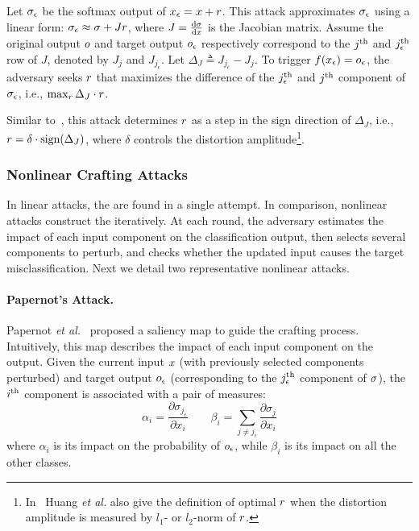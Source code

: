 Let $\sigma_\epsilon$ be the softmax output of $x_{\epsilon} = x + r$. This attack approximates $\sigma_\epsilon$ using a linear form:
$\sigma_\epsilon \approx \sigma + J r$,
 where $J = \frac{{\rm d} \sigma}{{\rm d} x}$ is the Jacobian matrix.
Assume the original output $o$ and target output $o_\epsilon$ respectively correspond to the $j^{\rm th}$ and $j_\epsilon^{\rm th}$ row of $J$, denoted by $J_j$ and $J_{j_\epsilon}$. Let $\Delta_J \triangleq J_{j_\epsilon}  - J_j$. To trigger $f(x_{\epsilon}) = o_\epsilon$, the adversary seeks $r$ that maximizes the difference of the $j_\epsilon^{\rm th}$ and $j^{\rm th}$ component of $\sigma_\epsilon$, i.e.,
$\max_{r}  \Delta_J  \cdot r$.

Similar to~\cite{Goodfellow:2014:arxiv}, this attack determines $r$ as a step in the sign direction of $\Delta_J$, i.e.,
$ r = \delta \cdot  \textrm{sign}(\Delta_J)$,
where $\delta$ controls the distortion amplitude\footnote{In~\cite{Huang:2015:arxiv} Huang {\em et al.} also give the definition of optimal $r$ when the distortion amplitude is measured by $l_1$- or $l_2$-norm of $r$.}.


\subsubsection{Nonlinear Crafting Attacks}

In linear attacks, the \pvs are found in a single attempt. In comparison, nonlinear attacks construct the \pvs iteratively. At each round, the adversary estimates the impact of each input component on the classification output, then selects several components to perturb, and checks whether the updated input causes the target misclassification.
Next we detail two representative nonlinear attacks.

\paragraph*{Papernot's Attack.\;} Papernot {\em et al.}~\cite{Papernot:2016:eurosp} proposed a saliency map to guide the crafting process. Intuitively, this map describes the impact of each input component on the output. Given the current input $x$ (with previously selected components perturbed) and target output $o_\epsilon$ (corresponding to the $j_\epsilon^{\rm th}$ component of $\sigma$), the $i^{\rm th}$ component is associated with a pair of measures:
\begin{displaymath}
\alpha_i  =  \frac{\partial \sigma_{j_\epsilon}}{\partial x_i} \qquad
\beta_i  =   \sum_{ j \neq j_\epsilon }\frac{\partial \sigma_j}{\partial x_i}
\end{displaymath}
where $\alpha_i$ is its impact on the probability of $o_\epsilon$, while $\beta_i$ is its impact on all the other classes.


